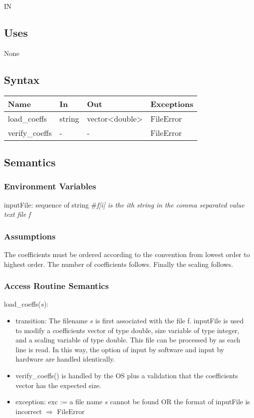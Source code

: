 \documentclass[12pt, titlepage]{article}
\begin{document}
IN

\subsection{Uses}

None

\subsection{Syntax}

\begin{tabular}{p{3cm} p{2cm} p{4cm} >{\raggedright\arraybackslash}p{9cm}}
\toprule
\textbf{Name} & \textbf{In} & \textbf{Out} & \textbf{Exceptions} \\
\midrule
load\_coeffs & string & vector<double> &  FileError \\
verify\_coeffs & - & - & FileError \\
\bottomrule
\end{tabular}

\subsection{Semantics}

\subsubsection{Environment Variables}

inputFile: sequence of string \#\textit{f[i] is the ith string in the comma separated value text file f}\\ 

\subsubsection{Assumptions}

The coefficients must be ordered according to the convention from lowest order to highest order.
The number of coefficients follows. Finally the scaling follows.

\subsubsection{Access Routine Semantics}

\noindent load\_coeffs($s$):
\begin{itemize}
\item transition: The filename $s$ is first associated with the file f.  {inputFile} is used to
  modify a coefficients vector of type double, size variable of type integer, and a scaling variable
  of type double. This file can be processed by  as each line is read.
  In this way, the option of input by software and input by hardware are handled identically.
\item verify\_coeffs() is handled by the OS plus a validation that the coefficients vector has the
  expected size.
\item exception: exc := a file name $s$ cannot be found OR the format of
  inputFile is incorrect $\Rightarrow$  FileError
\end{itemize}
\end{document}
